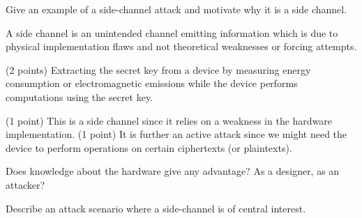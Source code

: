 \question\label{q:sidechannels}


\question[4]\label{q:sidechannels}
Give an example of a side-channel attack and motivate why it is a side channel.

\begin{solution}
  A side channel is an unintended channel emitting information which is due 
  to physical implementation flaws and not theoretical weaknesses or forcing 
  attempts.

  (2 points) Extracting the secret key from a device by measuring energy 
  consumption or electromagnetic emissions while the device performs 
  computations using the secret key.

  (1 point) This is a side channel since it relies on a weakness in the 
  hardware implementation.
  (1 point) It is further an active attack since we might need the device to 
  perform operations on certain ciphertexts (or plaintexts).
\end{solution}


\question\label{q:sidechannels}
Does knowledge about the hardware give any advantage? As a designer, as an 
attacker?


\question[2]\label{q:sidechannels}
Describe an attack scenario where a side-channel is of central interest.

